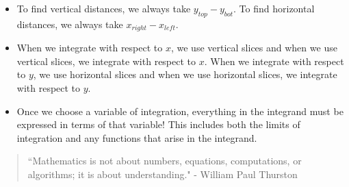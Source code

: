 \documentclass{ximera}
\begin{document}
\begin{itemize}
\item To find vertical distances, we always take $y_{top} - y_{bot}$.  To find horizontal distances, we always take $x_{right}-x_{left}$.

\item When we integrate with respect to $x$, we use vertical slices and when we use vertical slices, we integrate with respect to $x$.  When we integrate with respect to $y$, we use horizontal slices and when we use horizontal slices, we integrate with respect to $y$.

\item Once we choose a variable of integration, everything in the integrand must be expressed in terms of that variable!  This includes both the limits of integration and any functions that arise in the integrand.
\end{itemize}


\begin{quote}
``Mathematics is not about numbers, equations, computations, or algorithms; it is about understanding." - William Paul Thurston

\end{quote}
\end{document}
